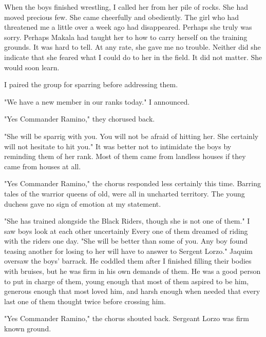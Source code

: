 \documentclass{article}
\begin{document}
When the boys finished wrestling, I called her from her pile of rocks. She had moved precious few. She came cheerfully and obediently. The girl who had threatened me a little over a week ago had disappeared. Perhaps she truly was sorry. Perhaps Makala had taught her to how to carry herself on the training grounds. It was hard to tell. At any rate, she gave me no trouble. Neither did she indicate that she feared what I could do to her in the field. It did not matter. She would soon learn.

I paired the group for sparring before addressing them.

"We have a new member in our ranks today." I announced.

"Yes Commander Ramino," they chorused back.

"She will be sparrig with you. You will not be afraid of hitting her. She certainly will not hesitate to hit you." It was better not to intimidate the boys by reminding them of her rank. Most of them came from landless houses if they came from houses at all.

"Yes Commander Ramino," the chorus responded less certainly this time. Barring tales of the warrior queens of old, were all in uncharted territory. The young duchess gave no sign of emotion at my statement. 

"She has trained alongside the Black Riders, though she is not one of them." I saw boys look at each other uncertainly Every one of them dreamed of riding with the riders one day. "She will be better than some of you. Any boy found teasing another for losing to her will have to answer to Sergent Lorzo." Jaquim oversaw the boys' barrack. He coddled them after I finished filling their bodies with bruises, but he was firm in his own demands of them. He was a good person to put in charge of them, young enough that most of them aspired to be him, generous enough that most loved him, and harsh enough when needed that every last one of them thought twice before crossing him.

"Yes Commander Ramino," the chorus shouted back. Sergeant Lorzo was firm known ground.
\end{document}
